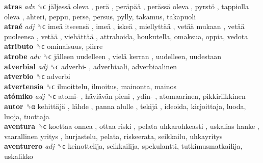 \textbf{atras} \emph{adv}  ␝ϲ   jäljessä oleva ,  perä ,  peräpää ,  perässä oleva ,  pyrstö ,  tappiolla oleva , ahteri, peppu, perse, persus, pylly, takamus, takapuoli  \\
\textbf{atraé} \emph{adj}  ␝ϲ   imeä itseensä ,  imeä ,  iskeä ,  miellyttää ,  vetää mukaan ,  vetää puoleensa ,  vetää ,  viehättää , attrahoida, houkutella, omaksua, oppia, vedota  \\
\textbf{atributo} ␝ϲ  ominaisuus, piirre  \\
\textbf{atrobe} \emph{adv}  ␝ϲ   jälleen uudelleen ,  vielä kerran , uudelleen, uudestaan  \\
\textbf{atverbial} \emph{adj}  ␝ϲ   adverbi- , adverbiaali, adverbiaalinen  \\
\textbf{atverbio} ␝ϲ  adverbi  \\
\textbf{atvertensia} ␝ϲ  ilmoittelu, ilmoitus, mainonta, mainos  \\
\textbf{atómiko} \emph{adj}  ␝ϲ   atomi- ,  häviävän pieni ,  ydin- , atomaarinen, pikkiriikkinen  \\
\textbf{autor} ␝α   kehittäjä ,  lähde ,  panna alulle ,  tekijä , ideoida, kirjoittaja, luoda, luoja, tuottaja  \\
\textbf{aventura} ␝ϲ   koettaa onnea ,  ottaa riski ,  pelata uhkarohkeasti ,  uskalias hanke ,  vaarallinen yritys , hurjastelu, pelata, riskeerata, seikkailu, uhkayritys  \\
\textbf{aventurero} \emph{adj}  ␝ϲ  keinottelija, seikkailija, spekulantti, tutkimusmatkailija, uskalikko  \\
